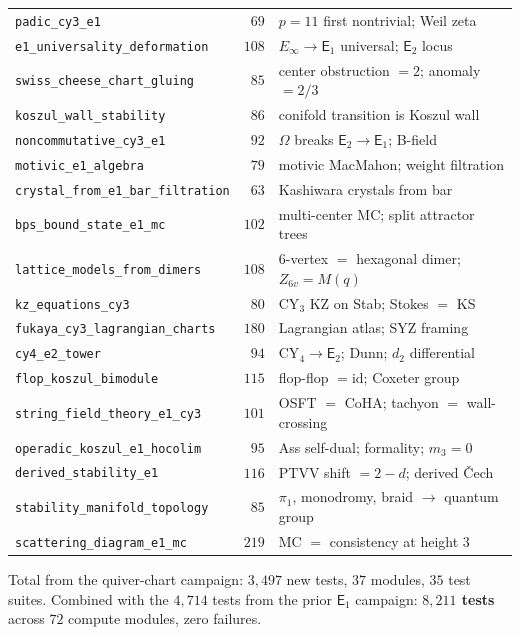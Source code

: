 \documentclass[11pt]{article}
\newcommand{\Eone}{\mathsf{E}_1}
\newcommand{\Etwo}{\mathsf{E}_2}
\begin{document}
\begin{center}
\begin{longtable}{lrl}
 \texttt{padic\_cy3\_e1} & $69$ & $p = 11$ first nontrivial; Weil zeta \\
 \texttt{e1\_universality\_deformation} & $108$ & $E_\infty \to \Eone$ universal; $\Etwo$ locus \\
 \texttt{swiss\_cheese\_chart\_gluing} & $85$ & center obstruction $= 2$; anomaly $= 2/3$ \\
 \texttt{koszul\_wall\_stability} & $86$ & conifold transition is Koszul wall \\
 \texttt{noncommutative\_cy3\_e1} & $92$ & $\Omega$ breaks $\Etwo \to \Eone$; B-field \\
 \texttt{motivic\_e1\_algebra} & $79$ & motivic MacMahon; weight filtration \\
 \texttt{crystal\_from\_e1\_bar\_filtration} & $63$ & Kashiwara crystals from bar \\
 \texttt{bps\_bound\_state\_e1\_mc} & $102$ & multi-center MC; split attractor trees \\
 \texttt{lattice\_models\_from\_dimers} & $108$ & $6$-vertex $=$ hexagonal dimer; $Z_{6v} = M(q)$ \\
 \texttt{kz\_equations\_cy3} & $80$ & CY$_3$ KZ on Stab; Stokes $=$ KS \\
 \texttt{fukaya\_cy3\_lagrangian\_charts} & $180$ & Lagrangian atlas; SYZ framing \\
 \texttt{cy4\_e2\_tower} & $94$ & CY$_4 \to \Etwo$; Dunn; $d_2$ differential \\
 \texttt{flop\_koszul\_bimodule} & $115$ & flop-flop $= \mathrm{id}$; Coxeter group \\
 \texttt{string\_field\_theory\_e1\_cy3} & $101$ & OSFT $=$ CoHA; tachyon $=$ wall-crossing \\
 \texttt{operadic\_koszul\_e1\_hocolim} & $95$ & Ass self-dual; formality; $m_3 = 0$ \\
 \texttt{derived\_stability\_e1} & $116$ & PTVV shift $= 2-d$; derived \v{C}ech \\
 \texttt{stability\_manifold\_topology} & $85$ & $\pi_1$, monodromy, braid $\to$ quantum group \\
 \texttt{scattering\_diagram\_e1\_mc} & $219$ & MC $=$ consistency at height $3$ \\
 \bottomrule
\end{longtable}
\end{center}

\noindent Total from the quiver-chart campaign: $3{,}497$ new tests, $37$ modules, $35$ test suites. Combined with the $4{,}714$ tests from the prior $\Eone$ campaign: \textbf{$8{,}211$ tests} across $72$ compute modules, zero failures.
\end{document}
